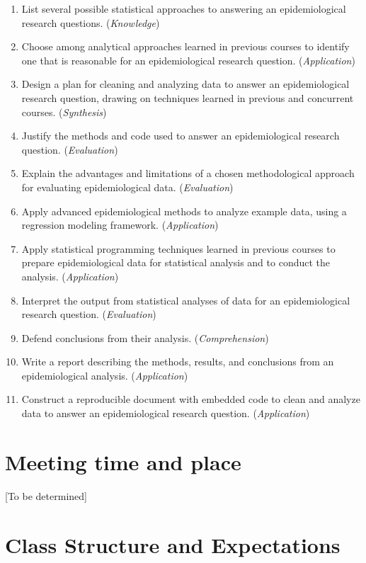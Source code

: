 \documentclass[
]{book}
\providecommand{\tightlist}{%
  \setlength{\itemsep}{0pt}\setlength{\parskip}{0pt}}
\begin{document}
\begin{enumerate}
\def\labelenumi{\arabic{enumi}.}
\tightlist
\item
  List several possible statistical approaches to answering an epidemiological
  research questions. (\emph{Knowledge})
\item
  Choose among analytical approaches learned in previous courses to identify
  one that is reasonable for an epidemiological research question. (\emph{Application})
\item
  Design a plan for cleaning and analyzing data to answer an epidemiological
  research question, drawing on techniques learned in previous and concurrent
  courses. (\emph{Synthesis})
\item
  Justify the methods and code used to answer an epidemiological research
  question. (\emph{Evaluation})
\item
  Explain the advantages and limitations of a chosen methodological approach
  for evaluating epidemiological data. (\emph{Evaluation})
\item
  Apply advanced epidemiological methods to analyze example data, using a
  regression modeling framework. (\emph{Application})
\item
  Apply statistical programming techniques learned in previous courses to
  prepare epidemiological data for statistical analysis and to conduct the
  analysis. (\emph{Application})
\item
  Interpret the output from statistical analyses of data for an epidemiological
  research question. (\emph{Evaluation})
\item
  Defend conclusions from their analysis. (\emph{Comprehension})
\item
  Write a report describing the methods, results, and conclusions from an
  epidemiological analysis. (\emph{Application})
\item
  Construct a reproducible document with embedded code to clean and analyze
  data to answer an epidemiological research question. (\emph{Application})
\end{enumerate}

\hypertarget{meeting-time-and-place}{%
\section{Meeting time and place}\label{meeting-time-and-place}}

{[}To be determined{]}

\hypertarget{class-structure-and-expectations}{%
\section{Class Structure and Expectations}\label{class-structure-and-expectations}}
\end{document}
